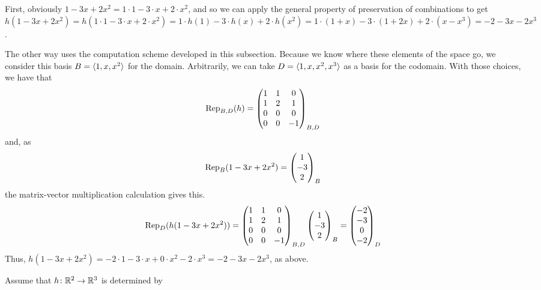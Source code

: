 \begin{exercises}
\begin{answer}
      First, obviously $1-3x+2x^2=1\cdot 1-3\cdot x+2\cdot x^2$, and so we can
      apply the general property of preservation of combinations to get
      $h(1-3x+2x^2)
       =h(1\cdot 1-3\cdot x+2\cdot x^2) 
       =1\cdot h(1)-3\cdot h(x)+2\cdot h(x^2) 
       =1\cdot (1+x)-3\cdot (1+2x)+2\cdot (x-x^3) 
       =-2-3x-2x^3$.

      The other way uses the computation scheme developed in this subsection.
      Because we know where these elements of the space go, we consider
      this basis \( B=\sequence{1,x,x^2} \) for the domain.
      Arbitrarily, we can take \( D=\sequence{1,x,x^2,x^3} \)
      as a basis for the codomain.
      With those choices, we have that
      \begin{equation*}
        \rep{h}{B,D}
        =\begin{pmatrix}
           1   &1  &0  \\
           1   &2  &1  \\
           0   &0  &0  \\
           0   &0  &-1
         \end{pmatrix}_{B,D}
      \end{equation*}
      and, as
      \begin{equation*}
        \rep{1-3x+2x^2}{B}=\colvec{1 \\ -3 \\ 2}_B
      \end{equation*}
      the matrix-vector multiplication calculation gives this.
      \begin{equation*}
        \rep{h(1-3x+2x^2)}{D}=
         \begin{pmatrix}
           1   &1  &0  \\
           1   &2  &1  \\
           0   &0  &0  \\
           0   &0  &-1
         \end{pmatrix}_{B,D}
         \colvec{1 \\ -3 \\ 2}_B
         =\colvec{-2 \\ -3 \\ 0 \\ -2}_D
      \end{equation*}
      Thus, \( h(1-3x+2x^2)
              =-2\cdot 1-3\cdot x+0\cdot x^2-2\cdot x^3
              =-2-3x-2x^3 \),
      as above.  
    \end{answer}
  \recommended \item  
    Assume that \( \map{h}{\Re^2}{\Re^3} \) is determined by 

\end{exercises}
